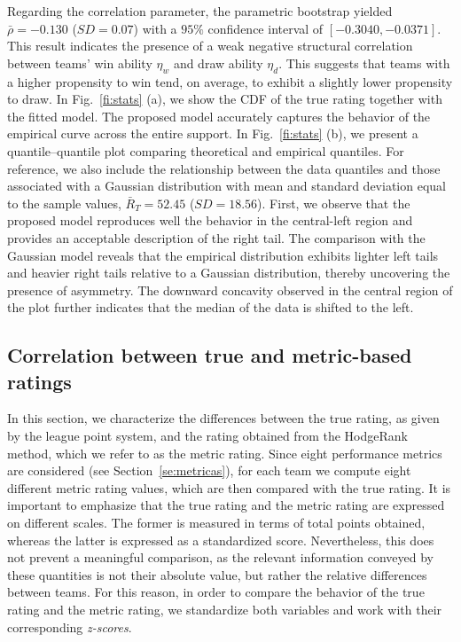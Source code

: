 \documentclass[preprint,12pt]{elsarticle}
\begin{document}
%
Regarding the correlation parameter, the parametric bootstrap yielded $\bar{\rho} = -0.130$ ($SD = 0.07$) with a $95\%$ confidence interval of $[-0.3040, -0.0371]$. This result indicates the presence of a weak negative structural correlation between teams’ win ability $\eta_w$ and draw ability $\eta_d$. This suggests that teams with a higher propensity to win tend, on average, to exhibit a slightly lower propensity to draw.
%
In Fig.~\ref{fi:stats} (a), we show the CDF of the true rating together with the fitted model. The proposed model accurately captures the behavior of the empirical curve across the entire support. In Fig.~\ref{fi:stats} (b), we present a quantile--quantile plot comparing theoretical and empirical quantiles. For reference, we also include the relationship between the data quantiles and those associated with a Gaussian distribution with mean and standard deviation equal to the sample values, $\bar{R}_T = 52.45$ ($SD = 18.56$).
%
First, we observe that the proposed model reproduces well the behavior in the central-left region and provides an acceptable description of the right tail. The comparison with the Gaussian model reveals that the empirical distribution exhibits lighter left tails and heavier right tails relative to a Gaussian distribution, thereby uncovering the presence of asymmetry. The downward concavity observed in the central region of the plot further indicates that the median of the data is shifted to the left.



\subsection{Correlation between true and metric-based ratings}
\label{sse:corr}

In this section, we characterize the differences between the true rating, as given by the league point system, and the rating obtained from the HodgeRank method, which we refer to as the metric rating.
%
Since eight performance metrics are considered (see Section~\ref{se:metricas}), for each team we compute eight different metric rating values, which are then compared with the true rating.
%
It is important to emphasize that the true rating and the metric rating are expressed on different scales. The former is measured in terms of total points obtained, whereas the latter is expressed as a standardized score.
%
Nevertheless, this does not prevent a meaningful comparison, as the relevant information conveyed by these quantities is not their absolute value, but rather the relative differences between teams.
%
For this reason, in order to compare the behavior of the true rating and the metric rating, we standardize both variables and work with their corresponding {\it z-scores}.
\end{document}
